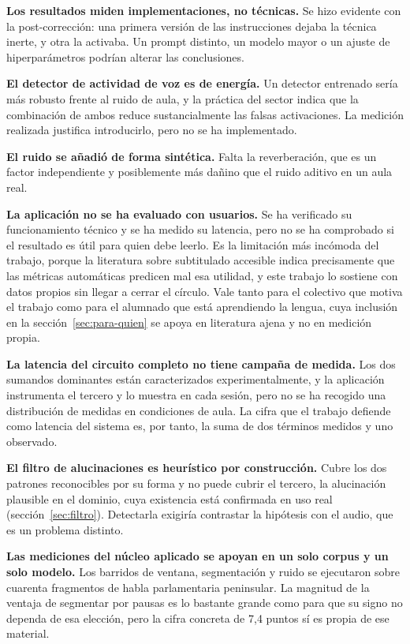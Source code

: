 \textbf{Los resultados miden implementaciones, no técnicas.} Se hizo evidente con la
post-corrección: una primera versión de las instrucciones dejaba la técnica inerte, y otra
la activaba. Un prompt distinto, un modelo mayor o un ajuste de hiperparámetros podrían
alterar las conclusiones.

\textbf{El detector de actividad de voz es de energía.} Un detector entrenado sería más
robusto frente al ruido de aula, y la práctica del sector indica que la combinación de
ambos reduce sustancialmente las falsas activaciones. La medición realizada justifica
introducirlo, pero no se ha implementado.

\textbf{El ruido se añadió de forma sintética.} Falta la reverberación, que es un factor
independiente y posiblemente más dañino que el ruido aditivo en un aula real.

\textbf{La aplicación no se ha evaluado con usuarios.} Se ha verificado su funcionamiento
técnico y se ha medido su latencia, pero no se ha comprobado si el resultado es útil para
quien debe leerlo. Es la limitación más incómoda del trabajo, porque la literatura sobre
subtitulado accesible \cite{kafle2017captions} indica precisamente que las métricas
automáticas predicen mal esa utilidad, y este trabajo lo sostiene con datos propios sin
llegar a cerrar el círculo. Vale tanto para el colectivo que motiva el trabajo como para el
alumnado que está aprendiendo la lengua, cuya inclusión en la
sección~\ref{sec:para-quien} se apoya en literatura ajena y no en medición propia.

\textbf{La latencia del circuito completo no tiene campaña de medida.} Los dos sumandos
dominantes están caracterizados experimentalmente, y la aplicación instrumenta el tercero y
lo muestra en cada sesión, pero no se ha recogido una distribución de medidas en condiciones
de aula. La cifra que el trabajo defiende como latencia del sistema es, por tanto, la suma de
dos términos medidos y uno observado.

\textbf{El filtro de alucinaciones es heurístico por construcción.} Cubre los dos patrones
reconocibles por su forma y no puede cubrir el tercero, la alucinación plausible en el
dominio, cuya existencia está confirmada en uso real (sección~\ref{sec:filtro}). Detectarla
exigiría contrastar la hipótesis con el audio, que es un problema distinto.

\textbf{Las mediciones del núcleo aplicado se apoyan en un solo corpus y un solo modelo.}
Los barridos de ventana, segmentación y ruido se ejecutaron sobre cuarenta fragmentos de
habla parlamentaria peninsular. La magnitud de la ventaja de segmentar por pausas es lo
bastante grande como para que su signo no dependa de esa elección, pero la cifra concreta de
7,4 puntos sí es propia de ese material.

